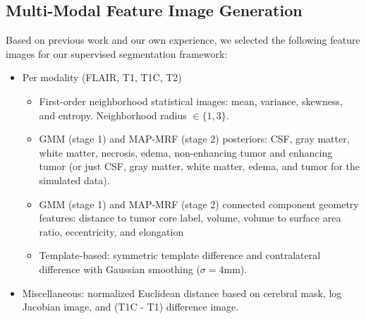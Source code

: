 \documentclass{llncs}
\begin{document}

\subsection{Multi-Modal Feature Image Generation}


Based on previous
work and our own experience, we selected the following feature images
for our supervised segmentation framework:
\begin{itemize}
  \item Per modality (FLAIR, T1, T1C, T2)
    \begin{itemize}
      \item First-order neighborhood statistical images:
            mean, variance, skewness, and entropy. 
            Neighborhood radius $\in \{1,3\}$.
    \item GMM (stage 1) and MAP-MRF (stage 2) posteriors: CSF, gray matter, white 
          matter, necrosis, edema, non-enhancing tumor and enhancing tumor (or just 
          CSF, gray matter, white 
          matter, edema, and tumor for the simulated data).
    \item GMM (stage 1) and MAP-MRF (stage 2) connected component geometry 
          features:  distance to tumor core label, volume, volume to surface area ratio, eccentricity, and elongation
    \item Template-based:  symmetric template difference and 
          contralateral difference with Gaussian smoothing ($\sigma = 4$mm).
    \end{itemize}
  \item Miscellaneous: normalized Euclidean distance based on cerebral mask,
    log Jacobian image, and  (T1C - T1) difference image.
\end{itemize}
\end{document}
